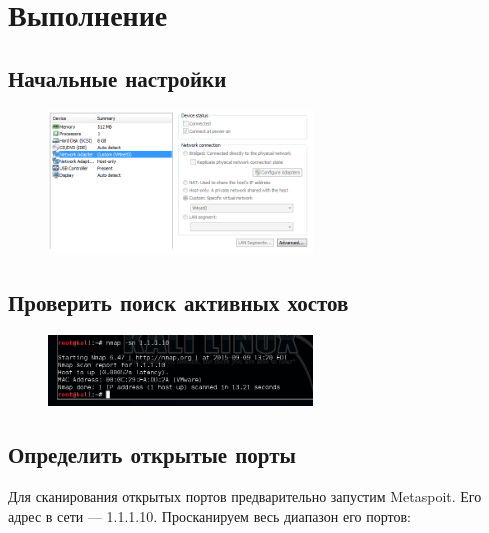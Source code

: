 \documentclass[utf8x, 12pt]{G7-32}
\begin{document}
\chapter{Выполнение}


\section{Начальные настройки}

\begin{figure}[hhh!]
	\begin{center}
		
		\includegraphics[width=7cm]{img2/nastr}
	\end{center}
\end{figure}




\newpage
\section{Проверить поиск активных хостов}

\begin{figure}[hhh!]
	\begin{center}
		
		\includegraphics[width=7cm]{img2/22}
	\end{center}
\end{figure}



\newpage
\section{Определить открытые порты}

Для сканирования открытых портов предварительно запустим Metaspoit. Его адрес в сети --- 1.1.1.10. Просканируем весь диапазон его портов:
\end{document}
